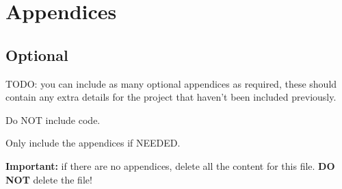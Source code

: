 
\part{Appendices}

\chapter{Optional}

TODO: you can include as many optional appendices as required, these should contain any extra details for the project that haven't been included previously. 

Do NOT include code.

Only include the appendices if NEEDED.

\textbf{Important:} if there are no appendices, delete all the content for this file. \textbf{DO NOT} delete the file!
